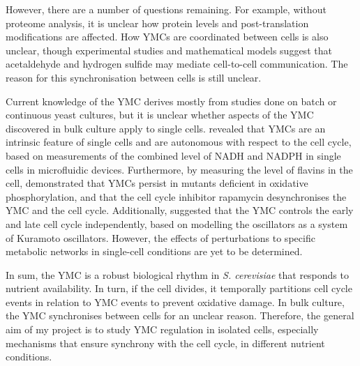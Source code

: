 However, there are a number of questions remaining.
For example, without proteome analysis, it is unclear how protein levels and post-translation modifications are affected.
How YMCs are coordinated between cells is also unclear, though experimental studies \citep{murrayRegulationYeastOscillatory2007} and mathematical models \citep{krishnaMinimalPushPull2018} suggest that acetaldehyde and hydrogen sulfide may mediate cell-to-cell communication.
The reason for this synchronisation between cells is still unclear. %

Current knowledge of the YMC derives mostly from studies done on batch or continuous yeast cultures, but it is unclear whether aspects of the YMC discovered in bulk culture apply to single cells.
\citet{papagiannakisAutonomousMetabolicOscillations2017} revealed that YMCs are an intrinsic feature of single cells and are autonomous with respect to the cell cycle, based on measurements of the combined level of NADH and NADPH in single cells in microfluidic devices.
Furthermore, by measuring the level of flavins in the cell, \citet{baumgartnerFlavinbasedMetabolicCycles2018} demonstrated that YMCs persist in mutants deficient in oxidative phosphorylation, and that the cell cycle inhibitor rapamycin desynchronises the YMC and the cell cycle.
Additionally, \citet{ozsezenInferenceHighLevelInteraction2019} suggested that the YMC controls the early and late cell cycle independently, based on modelling the oscillators as a system of Kuramoto oscillators.
However, the effects of perturbations to specific metabolic networks in single-cell conditions are yet to be determined.


In sum, the YMC is a robust biological rhythm in \emph{S. cerevisiae} that responds to nutrient availability.
In turn, if the cell divides, it temporally partitions cell cycle events in relation to YMC events to prevent oxidative damage.
In bulk culture, the YMC synchronises between cells for an unclear reason.
Therefore, the general aim of my project is to study YMC regulation in isolated cells, especially mechanisms that ensure synchrony with the cell cycle, in different nutrient conditions.

